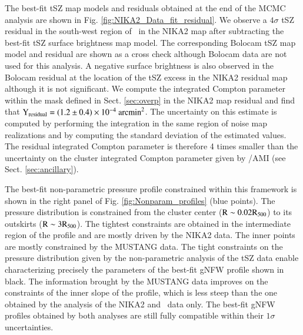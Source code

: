 \documentclass[traditabstract]{aa}
\begin{document}
The best-fit tSZ map models and residuals obtained at the end of the MCMC analysis are shown in Fig. \ref{fig:NIKA2_Data_fit_residual}. We observe a $4\sigma$ tSZ residual in the south-west region of \psz\ in the NIKA2 map after subtracting the best-fit tSZ surface brightness map model. The corresponding Bolocam tSZ map model and residual are shown as a cross check although Bolocam data are not used for this analysis. A negative surface brightness is also observed in the Bolocam residual at the location of the tSZ excess in the NIKA2 residual map although it is not significant. We compute the integrated Compton parameter within the mask defined in Sect. \ref{sec:overp} in the NIKA2 map residual and find that $\rm{Y_{residual}} = (1.2 \pm 0.4) \times 10^{-4}~\mathrm{arcmin}^2$. The uncertainty on this estimate is computed by performing the integration in the same region of noise map realizations and by computing the standard deviation of the estimated values. The residual integrated Compton parameter is therefore 4 times smaller than the uncertainty on the cluster integrated Compton parameter given by {\planck}/AMI (see Sect. \ref{sec:ancillary}). 

The best-fit non-parametric pressure profile constrained within this framework is shown in the right panel of Fig. \ref{fig:Nonparam_profiles} (blue points). The pressure distribution is constrained from the cluster center ($\rm{R} \sim 0.02 \rm{R_{500}}$) to its outskirts ($\rm{R} \sim 3 \rm{R_{500}}$). The tightest constraints are obtained in the intermediate region of the profile and are mostly driven by the NIKA2 data. The inner points are mostly constrained by the MUSTANG data. The tight constraints on the pressure distribution given by the non-parametric analysis of the tSZ data enable characterizing precisely the parameters of the best-fit gNFW profile shown in black. The information brought by the MUSTANG data improves on the constraints of the inner slope of the profile, which is less steep than the one obtained by the analysis of the NIKA2 and \planck\ data only. The best-fit gNFW profiles obtained by both analyses are still fully compatible within their $1\sigma$ uncertainties.\\
\end{document}
